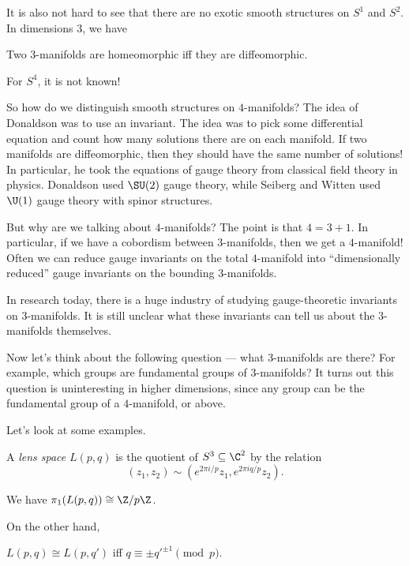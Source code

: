 \documentclass[a4paper]{article}
\begin{document}
It is also not hard to see that there are no exotic smooth structures on $S^1$ and $S^2$. In dimensions 3, we have
\begin{thm}[Morse]
  Two $3$-manifolds are homeomorphic iff they are diffeomorphic.
\end{thm}

For $S^4$, it is not known!

So how do we distinguish smooth structures on $4$-manifolds? The idea of Donaldson was to use an invariant. The idea was to pick some differential equation and count how many solutions there are on each manifold. If two manifolds are diffeomorphic, then they should have the same number of solutions! In particular, he took the equations of gauge theory from classical field theory in physics. Donaldson used $\SU(2)$ gauge theory, while Seiberg and Witten used $\U(1)$ gauge theory with spinor structures.

But why are we talking about $4$-manifolds? The point is that $4 = 3 + 1$. In particular, if we have a cobordism between $3$-manifolds, then we get a $4$-manifold! Often we can reduce gauge invariants on the total $4$-manifold into ``dimensionally reduced'' gauge invariants on the bounding $3$-manifolds.

In research today, there is a huge industry of studying gauge-theoretic invariants on $3$-manifolds. It is still unclear what these invariants can tell us about the $3$-manifolds themselves.

Now let's think about the following question --- what $3$-manifolds are there? For example, which groups are fundamental groups of $3$-manifolds? It turns out this question is uninteresting in higher dimensions, since any group can be the fundamental group of a $4$-manifold, or above.

Let's look at some examples.
\begin{defi}
  A \emph{lens space} $L(p, q)$ is the quotient of $S^3 \subseteq \C^2$ by the relation
  \[
    (z_1, z_2) \sim (e^{2\pi i/p} z_1, e^{2\pi i q/p} z_2).
  \]
\end{defi}

\begin{prop}
  We have $\pi_1(L(p, q)) \cong \Z/p\Z$.
\end{prop}

On the other hand,
\begin{thm}[Reidemeister]
  $L(p, q) \cong L(p, q')$ iff $q \equiv \pm q'^{\pm 1} \pmod p$.
\end{thm}
\end{document}
